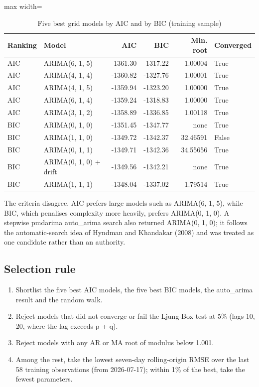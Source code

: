 \documentclass[11pt,a4paper]{article}
\begin{document}
\begin{table}[H]
\centering
\caption{Five best grid models by AIC and by BIC (training sample)}
\footnotesize
\setlength{\tabcolsep}{4pt}
\begin{adjustbox}{max width=\linewidth}
\begin{tabular}{llrrrl}
\toprule
\textbf{Ranking} & \textbf{Model} & \textbf{AIC} & \textbf{BIC} & \textbf{Min. root} & \textbf{Converged} \\
\midrule
AIC & ARIMA(6, 1, 5) & -1361.30 & -1317.22 & 1.00004 & True \\
AIC & ARIMA(4, 1, 4) & -1360.82 & -1327.76 & 1.00001 & True \\
AIC & ARIMA(4, 1, 5) & -1359.94 & -1323.20 & 1.00000 & True \\
AIC & ARIMA(6, 1, 4) & -1359.24 & -1318.83 & 1.00000 & True \\
AIC & ARIMA(3, 1, 2) & -1358.89 & -1336.85 & 1.00118 & True \\
BIC & ARIMA(0, 1, 0) & -1351.45 & -1347.77 & none & True \\
BIC & ARIMA(1, 1, 0) & -1349.72 & -1342.37 & 32.46591 & False \\
BIC & ARIMA(0, 1, 1) & -1349.71 & -1342.36 & 34.55656 & True \\
BIC & ARIMA(0, 1, 0) + drift & -1349.56 & -1342.21 & none & True \\
BIC & ARIMA(1, 1, 1) & -1348.04 & -1337.02 & 1.79514 & True \\
\bottomrule
\end{tabular}
\end{adjustbox}
\end{table}

The criteria disagree. AIC prefers large models such as ARIMA(6, 1, 5), while BIC, which penalises complexity more heavily, prefers ARIMA(0, 1, 0). A stepwise pmdarima auto\_arima search also returned ARIMA(0, 1, 0); it follows the automatic-search idea of Hyndman and Khandakar (2008) and was treated as one candidate rather than an authority.

\subsection{Selection rule}

\begin{enumerate}
  \item Shortlist the five best AIC models, the five best BIC models, the auto\_arima result and the random walk.
  \item Reject models that did not converge or fail the Ljung-Box test at 5\% (lags 10, 20, where the lag exceeds p + q).
  \item Reject models with any AR or MA root of modulus below 1.001.
  \item Among the rest, take the lowest seven-day rolling-origin RMSE over the last 58 training observations (from 2026-07-17); within 1\% of the best, take the fewest parameters.
\end{enumerate}
\end{document}
